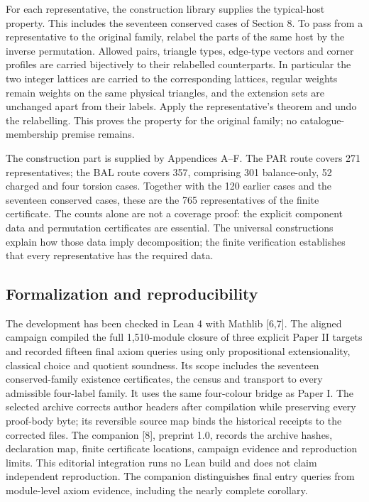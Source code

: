 \documentclass[english,11pt,a4paper]{article}
\begin{document}
For each representative, the construction library supplies the typical-host property. This includes the seventeen conserved cases of Section 8. To pass from a representative to the original family, relabel the parts of the same host by the inverse permutation. Allowed pairs, triangle types, edge-type vectors and corner profiles are carried bijectively to their relabelled counterparts. In particular the two integer lattices are carried to the corresponding lattices, regular weights remain weights on the same physical triangles, and the extension sets are unchanged apart from their labels. Apply the representative's theorem and undo the relabelling. This proves the property for the original family; no catalogue-membership premise remains.

The construction part is supplied by Appendices A--F. The PAR route covers 271 representatives; the BAL route covers 357, comprising 301 balance-only, 52 charged and four torsion cases. Together with the 120 earlier cases and the seventeen conserved cases, these are the 765 representatives of the finite certificate. The counts alone are not a coverage proof: the explicit component data and permutation certificates are essential. The universal constructions explain how those data imply decomposition; the finite verification establishes that every representative has the required data.

\subsection{Formalization and reproducibility}\label{formalization-and-reproducibility}

The development has been checked in Lean 4 with Mathlib {[}6,7{]}. The aligned campaign compiled the full 1,510-module closure of three explicit Paper II targets and recorded fifteen final axiom queries using only propositional extensionality, classical choice and quotient soundness. Its scope includes the seventeen conserved-family existence certificates, the census and transport to every admissible four-label family. It uses the same four-colour bridge as Paper I. The selected archive corrects author headers after compilation while preserving every proof-body byte; its reversible source map binds the historical receipts to the corrected files. The companion {[}8{]}, preprint 1.0, records the archive hashes, declaration map, finite certificate locations, campaign evidence and reproduction limits. This editorial integration runs no Lean build and does not claim independent reproduction. The companion distinguishes final entry queries from module-level axiom evidence, including the nearly complete corollary.
\end{document}
